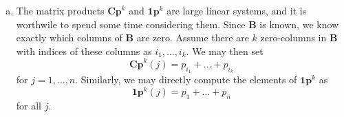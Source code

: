 \documentclass[12pt, oneside, article, a4paper]{memoir}
\newcommand{\mat}[1]{\bm{#1}}
\begin{document}
\begin{enumerate}[a)]
        \item
        The matrix products \( \mat{Cp}^k \) and \( \mat{1p}^k \) are large
        linear systems, and it is worthwile to spend some time considering
        them.  Since \( \mat{B} \) is known, we know exactly which columns of \(
        \mat{B} \) are zero. Assume there are \( k \) zero-columns in \(
        \mat{B} \) with indices of these columns as \( i_1, \ldots, i_k \). We
        may then set
        \begin{equation}
            \mat{Cp}^k(j) = p_{i_1} + \ldots + p_{i_k} 
        \end{equation}
        for \( j = 1, \ldots, n \).  Similarly, we may directly compute the
        elements of \( \mat{1p}^k \) as
        \begin{equation}
            \mat{1p}^k(j) = p_1 + \ldots + p_n 
        \end{equation}
        for all \( j \).


\end{enumerate}
\end{document}
